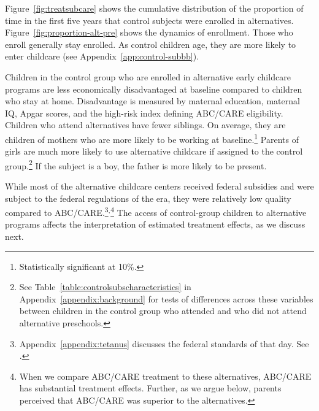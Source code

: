 Figure~\ref{fig:treatsubcare} shows the cumulative distribution of the proportion of time in the first five years that control subjects were enrolled in alternatives. Figure~\ref{fig:proportion-alt-pre} shows the dynamics of enrollment. Those who enroll generally stay enrolled. As control children age, they are more likely to enter childcare (see Appendix~\ref{app:control-subbb}).

Children in the control group who are enrolled in alternative early childcare programs are less economically disadvantaged at baseline compared to children who stay at home. Disadvantage is measured by maternal education, maternal IQ, Apgar scores, and the high-risk index defining ABC/CARE eligibility. Children who attend alternatives have fewer siblings. On average, they are children of mothers who are more likely to be working at baseline.\footnote{Statistically significant at 10\%.} Parents of girls are much more likely to use alternative childcare if assigned to the control group.\footnote{See Table~\ref{table:controlsubscharacteristics} in Appendix~\ref{appendix:background} for tests of differences across these variables between children in the control group who attended and who did not attend alternative preschools.} If the subject is a boy, the father is more likely to be present.

While most of the alternative childcare centers received federal subsidies and were subject to the federal regulations of the era, they were relatively low quality compared to ABC/CARE.\footnote{Appendix~\ref{appendix:tetanus} discusses the federal standards of that day. See \citet{Department-of-Health_1968_DayCareRequirements,NCGA_1971_House-Bill-100,Ramey-et-al_1977_Intro-to-ABC,Ramey_Campbell_1979_SR,Ramey_McGinness_etal_1982_Abecedarianapproach, Burchinal_Campbell_etal_1997_CD}.}$^,$\footnote{When we compare ABC/CARE treatment to these alternatives, ABC/CARE has substantial treatment effects. Further, as we argue below, parents perceived that ABC/CARE was superior to the alternatives.} The access of control-group children to alternative programs affects the interpretation of estimated treatment effects, as we discuss next.
